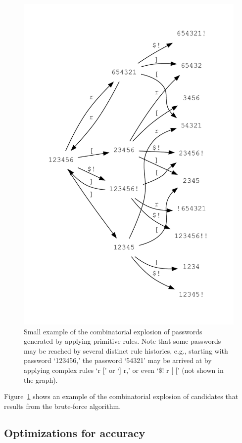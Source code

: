 \documentclass[letterpaper,twocolumn,10pt]{article}
\begin{document}
\begin{figure}
\includegraphics[width=\linewidth]{example-pw-rules.pdf}
\caption{Small example of the combinatorial explosion of passwords generated by
applying primitive rules. Note that some passwords may be reached by several
distinct rule histories, e.g., starting with password `123456,' the password
`54321' may be arrived at by applying complex rules `r [' or `] r,' or
even `\$! r [ [' (not shown in the graph).}
\label{fig:pwgen}
\end{figure}

Figure~\ref{fig:pwgen} shows an example of the combinatorial explosion of
candidates that results from the brute-force algorithm.

\subsection{Optimizations for accuracy}
\end{document}
